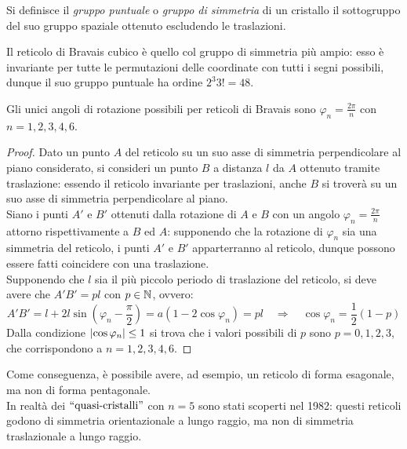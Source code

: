 \begin{definition}
	Si definisce il \textit{gruppo puntuale} o \textit{gruppo di simmetria} di un cristallo il sottogruppo del suo gruppo spaziale ottenuto escludendo le traslazioni.
\end{definition}

\begin{example}
	Il reticolo di Bravais cubico è quello col gruppo di simmetria più ampio: esso è invariante per tutte le permutazioni delle coordinate con tutti i segni possibili, dunque il suo gruppo puntuale ha ordine $ 2^3 3! = 48 $.
\end{example}

\begin{theorem}
	Gli unici angoli di rotazione possibili per reticoli di Bravais sono $ \varphi_n = \frac{2\pi}{n} $ con $ n = 1,2,3,4,6 $.
\end{theorem}
\begin{proof}
	Dato un punto $ A $ del reticolo su un suo asse di simmetria perpendicolare al piano considerato, si consideri un punto $ B $ a distanza $ l $ da $ A $ ottenuto tramite traslazione: essendo il reticolo invariante per traslazioni, anche $ B $ si troverà su un suo asse di simmetria perpendicolare al piano.\\
	Siano i punti $ A' $ e $ B' $ ottenuti dalla rotazione di $ A $ e $ B $ con un angolo $ \varphi_n = \frac{2\pi}{n} $ attorno rispettivamente a $ B $ ed $ A $: supponendo che la rotazione di $ \varphi_n $ sia una simmetria del reticolo, i punti $ A' $ e $ B' $ apparterranno al reticolo, dunque possono essere fatti coincidere con una traslazione.\\
	Supponendo che $ l $ sia il più piccolo periodo di traslazione del reticolo, si deve avere che $ A'B' = pl $ con $ p \in \mathbb{N} $, ovvero:
	\begin{equation*}
		A'B' = l + 2l \sin \left( \varphi_n - \frac{\pi}{2} \right) = a \left( 1 - 2 \cos \varphi_n \right) = p l \quad \Rightarrow \quad \cos \varphi_n = \frac{1}{2} (1 - p)
	\end{equation*}
	Dalla condizione $ \left\lvert\cos \varphi_n\right\rvert \le 1 $ si trova che i valori possibili di $ p $ sono $ p = 0,1,2,3 $, che corrispondono a $ n = 1,2,3,4,6 $.
\end{proof}

Come conseguenza, è possibile avere, ad esempio, un reticolo di forma esagonale, ma non di forma pentagonale.\\
In realtà dei $ ``\text{quasi-cristalli}" $ con $ n = 5 $ sono stati scoperti nel 1982: questi reticoli godono di simmetria orientazionale a lungo raggio, ma non di simmetria traslazionale a lungo raggio.

